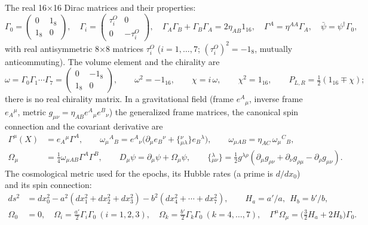 \documentclass[10pt,a4paper]{article}
\begin{document}
The real 16×16 Dirac matrices and their properties:
\begin{equation*}
\Gamma_0=\begin{pmatrix}0&1_8\\1_8&0\end{pmatrix},\quad \Gamma_i=\begin{pmatrix}\tau^O_i&0\\0&-\tau^O_i\end{pmatrix},\quad \Gamma_A\Gamma_B+\Gamma_B\Gamma_A=2\eta_{AB}1_{16},\quad \Gamma^A=\eta^{AA}\Gamma_A,\quad \bar\psi=\psi^\dagger\Gamma_0,
\end{equation*}
with real antisymmetric 8×8 matrices $\tau^O_i$ ($i=1,\dots,7$; $(\tau^O_i)^2=-1_8$, mutually anticommuting). The volume element and the chirality are
\begin{equation*}
\omega=\Gamma_0\Gamma_1\cdots\Gamma_7=\begin{pmatrix}0&-1_8\\1_8&0\end{pmatrix},\qquad \omega^2=-1_{16},\qquad \chi=i\,\omega,\qquad \chi^2=1_{16},\qquad P_{L,R}=\tfrac12(1_{16}\mp\chi);
\end{equation*}
there is no real chirality matrix. In a gravitational field (frame $e^A{}_\mu$, inverse frame $e_A{}^\mu$, metric $g_{\mu\nu}=\eta_{AB}e^A{}_\mu e^B{}_\nu$) the generalized frame matrices, the canonical spin connection and the covariant derivative are
\begin{align*}
\Gamma^\mu(X)&=e_A{}^\mu\Gamma^A,\qquad \omega_\mu{}^A{}_B=e^A{}_\nu\big(\partial_\mu e_B{}^\nu+\{{}^{\nu}_{\mu\lambda}\}e_B{}^\lambda\big),\qquad \omega_{\mu AB}=\eta_{AC}\,\omega_\mu{}^C{}_B, \\
\Omega_\mu&=\tfrac14\omega_{\mu AB}\Gamma^A\Gamma^B,\qquad D_\mu\psi=\partial_\mu\psi+\Omega_\mu\psi,\qquad \{{}^{\lambda}_{\mu\nu}\}=\tfrac12g^{\lambda\rho}(\partial_\mu g_{\rho\nu}+\partial_\nu g_{\rho\mu}-\partial_\rho g_{\mu\nu}).
\end{align*}
The cosmological metric used for the epochs, its Hubble rates (a prime is $d/dx_0$) and its spin connection:
\begin{align*}
ds^2&=dx_0^2-a^2(dx_1^2+dx_2^2+dx_3^2)-b^2(dx_4^2+\cdots+dx_7^2),\qquad H_a=a'/a,\ \ H_b=b'/b, \\
\Omega_0&=0,\quad \Omega_i=\tfrac{a'}{2}\Gamma_i\Gamma_0\ (i=1,2,3),\quad \Omega_k=\tfrac{b'}{2}\Gamma_k\Gamma_0\ (k=4,\dots,7),\quad \Gamma^\mu\Omega_\mu=\big(\tfrac32H_a+2H_b\big)\Gamma_0 .
\end{align*}
\end{document}
